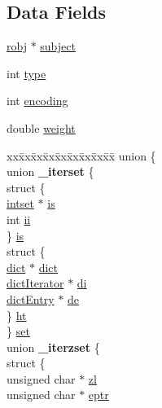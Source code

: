 \subsection*{Data Fields}
\begin{DoxyCompactItemize}
\item 
\hyperlink{server_8h_a540f174d2685422fbd7d12e3cd44c8e2}{robj} $\ast$ \hyperlink{structzsetopsrc_a8bd087874443f3e41cf5f728d8490693}{subject}
\item 
int \hyperlink{structzsetopsrc_ac765329451135abec74c45e1897abf26}{type}
\item 
int \hyperlink{structzsetopsrc_ad1b45f33065aae3c757f56a692b25741}{encoding}
\item 
double \hyperlink{structzsetopsrc_a99108733d00274978a4979dc072bd513}{weight}
\item 
\begin{tabbing}
xx\=xx\=xx\=xx\=xx\=xx\=xx\=xx\=xx\=\kill
union \{\\
\>union {\bfseries \_iterset} \{\\
\>\>struct \{\\
\>\>\>\hyperlink{structintset}{intset} $\ast$ \hyperlink{structzsetopsrc_ac4d4f9a0415679602254219d56c0bd08}{is}\\
\>\>\>int \hyperlink{structzsetopsrc_aa5b6e783cf10163187df5705f0d82d47}{ii}\\
\>\>\} \hyperlink{structzsetopsrc_a71dffe01ae0ae6b648de3cba547ce618}{is}\\
\>\>struct \{\\
\>\>\>\hyperlink{structdict}{dict} $\ast$ \hyperlink{structzsetopsrc_aad961c2f260766ff3627bf363fef3551}{dict}\\
\>\>\>\hyperlink{structdict_iterator}{dictIterator} $\ast$ \hyperlink{structzsetopsrc_a30e26ff2250d4d8b49241087d755342a}{di}\\
\>\>\>\hyperlink{structdict_entry}{dictEntry} $\ast$ \hyperlink{structzsetopsrc_ad42c838fd43654444c8d4492319e1949}{de}\\
\>\>\} \hyperlink{structzsetopsrc_a7d5e82c5e0e4e3a3efa3e85e6f17c712}{ht}\\
\>\} \hyperlink{structzsetopsrc_a139212a862c05a31a4c3abc578bee0c2}{set}\\
\>union {\bfseries \_iterzset} \{\\
\>\>struct \{\\
\>\>\>unsigned char $\ast$ \hyperlink{structzsetopsrc_a1ae48f85ded0fe46acd8864ac807f6b8}{zl}\\
\>\>\>unsigned char $\ast$ \hyperlink{structzsetopsrc_ab803ff63f701b36124754066cd4906a3}{eptr}\\

\end{tabbing}
\end{DoxyCompactItemize}
